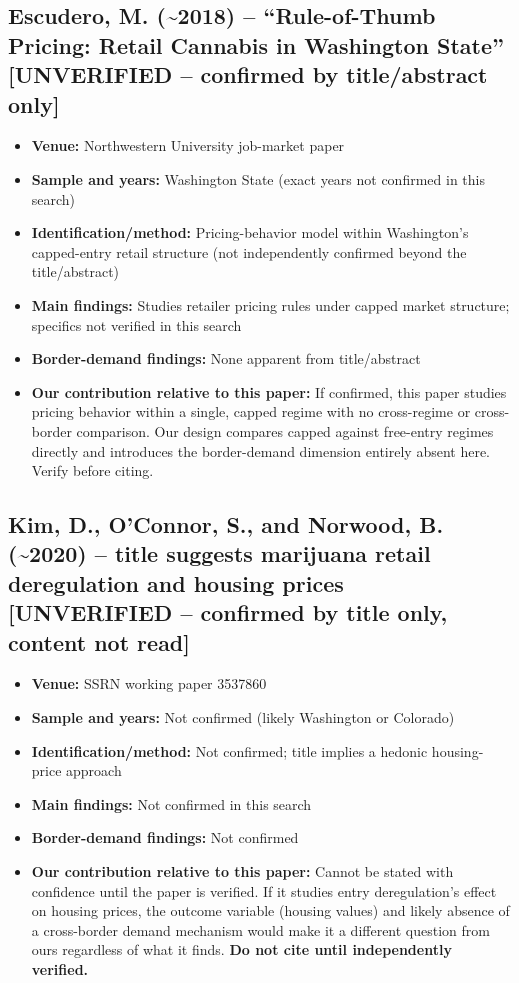 \documentclass[11pt]{article}
\begin{document}
\subsection{Escudero, M. (\textasciitilde 2018) -- ``Rule-of-Thumb Pricing: Retail Cannabis in Washington
State'' \textbf{[UNVERIFIED -- confirmed by title/abstract only]}}
\begin{itemize}
\item \textbf{Venue:} Northwestern University job-market paper
\item \textbf{Sample and years:} Washington State (exact years not confirmed in this search)
\item \textbf{Identification/method:} Pricing-behavior model within Washington's capped-entry retail
structure (not independently confirmed beyond the title/abstract)
\item \textbf{Main findings:} Studies retailer pricing rules under capped market structure; specifics not
verified in this search
\item \textbf{Border-demand findings:} None apparent from title/abstract
\item \textbf{Our contribution relative to this paper:} If confirmed, this paper studies pricing behavior
within a single, capped regime with no cross-regime or cross-border comparison. Our design compares capped
against free-entry regimes directly and introduces the border-demand dimension entirely absent here. Verify
before citing.
\end{itemize}

\subsection{Kim, D., O'Connor, S., and Norwood, B. (\textasciitilde 2020) -- title suggests marijuana retail
deregulation and housing prices \textbf{[UNVERIFIED -- confirmed by title only, content not read]}}
\begin{itemize}
\item \textbf{Venue:} SSRN working paper 3537860
\item \textbf{Sample and years:} Not confirmed (likely Washington or Colorado)
\item \textbf{Identification/method:} Not confirmed; title implies a hedonic housing-price approach
\item \textbf{Main findings:} Not confirmed in this search
\item \textbf{Border-demand findings:} Not confirmed
\item \textbf{Our contribution relative to this paper:} Cannot be stated with confidence until the paper is
verified. If it studies entry deregulation's effect on housing prices, the outcome variable (housing values)
and likely absence of a cross-border demand mechanism would make it a different question from ours regardless
of what it finds. \textbf{Do not cite until independently verified.}
\end{itemize}
\end{document}
